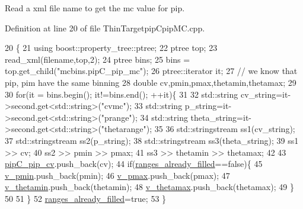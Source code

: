 Read a xml file name to get the mc value for pip. 



Definition at line 20 of file Thin\-Targetpip\-Cpip\-M\-C.\-cpp.


\begin{DoxyCode}
20                                                                     \{
21     \textcolor{keyword}{using} boost::property\_tree::ptree;
22     ptree top;
23     read\_xml(filename,top,2); 
24     ptree bins;
25     bins = top.get\_child(\textcolor{stringliteral}{"mcbins.pipC\_pip\_mc"});
26     ptree::iterator it;    
27     \textcolor{comment}{// we know that pip, pim have the same binning}
28     \textcolor{keywordtype}{double} cv,pmin,pmax,thetamin,thetamax;
29     
30     \textcolor{keywordflow}{for}(it = bins.begin(); it!=bins.end(); ++it)\{
31    
32       std::string cv\_string=it->second.get<std::string>(\textcolor{stringliteral}{"cvmc"});
33       std::string p\_string=it->second.get<std::string>(\textcolor{stringliteral}{"prange"});
34       std::string theta\_string=it->second.get<std::string>(\textcolor{stringliteral}{"thetarange"});
35 
36       std::stringstream ss1(cv\_string);
37       std::stringstream ss2(p\_string);
38       std::stringstream ss3(theta\_string);
39       ss1 >> cv;
40       ss2 >> pmin >> pmax;
41       ss3 >> thetamin >> thetamax;
42    
43       \hyperlink{class_neutrino_flux_reweight_1_1_thin_targetpip_cpip_m_c_ad8949d3657924de68ffab295b47b9ae5}{pipC\_pip\_cv}.push\_back(cv);
44       \textcolor{keywordflow}{if}(\hyperlink{class_neutrino_flux_reweight_1_1_thin_targetpip_cpip_m_c_a59e7329b684e22bda7a4f31bdcbc081e}{ranges\_already\_filled}==\textcolor{keyword}{false})\{
45         \hyperlink{class_neutrino_flux_reweight_1_1_thin_targetpip_cpip_m_c_acfe77250a611ddad7eff49870fc1cc79}{v\_pmin}.push\_back(pmin);
46         \hyperlink{class_neutrino_flux_reweight_1_1_thin_targetpip_cpip_m_c_a49368fcb9ec3b6fe7aa1da61b3f12599}{v\_pmax}.push\_back(pmax);
47         \hyperlink{class_neutrino_flux_reweight_1_1_thin_targetpip_cpip_m_c_adbd4423fe4ede8e69dc1019fd3988c40}{v\_thetamin}.push\_back(thetamin);
48         \hyperlink{class_neutrino_flux_reweight_1_1_thin_targetpip_cpip_m_c_a338bfb845380a4c3badcb591821b8da0}{v\_thetamax}.push\_back(thetamax);
49       \}
50       
51     \}
52     \hyperlink{class_neutrino_flux_reweight_1_1_thin_targetpip_cpip_m_c_a59e7329b684e22bda7a4f31bdcbc081e}{ranges\_already\_filled}=\textcolor{keyword}{true};
53     \}
\end{DoxyCode}


